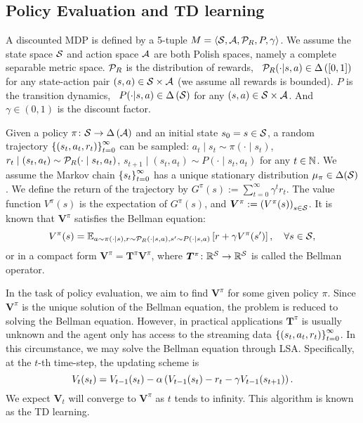 \subsection{Policy Evaluation and TD learning}\label{Subsection:policy_eval_and_TD}
A discounted MDP is defined by a 5-tuple $M=\langle{\mathcal{S}},{\mathcal{A}},{\mathcal{P}}_R,P,\gamma\rangle$.
We assume the state space ${\mathcal{S}}$ and action space ${\mathcal{A}}$ are both Polish spaces, namely a complete separable metric space.
${{\mathcal{P}}_R}$ is the distribution of rewards,  \ie\ ${\mathcal{P}}_R(\cdot|s,a)\in\Delta\left({[0,1]}\right)$ for any state-action pair $(s,a)\in{\mathcal{S}}\times{\mathcal{A}}$ (we assume all rewards is bounded).
${P}$ is the transition dynamics, \ie\ $P(\cdot|s,a)\in\Delta\left({{\mathcal{S}}}\right)$ for any $(s,a)\in{\mathcal{S}}\times{\mathcal{A}}$.
And $\gamma\in(0,1)$ is the discount factor.

Given a policy $\pi\colon{\mathcal{S}}\to\Delta\left({{\mathcal{A}}}\right)$ and an initial state $s_0=s\in{\mathcal{S}}$, a random trajectory $\left\{{\left({s_t,a_t,r_t}\right)}\right\}_{t=0}^\infty$ can be sampled: $a_t\mid s_t\sim\pi(\cdot\mid s_t)$, $r_t\mid (s_t,a_t)\sim {\mathcal{P}}_R({\cdot}\mid s_t,a_t)$, ${s_{t+1}}\mid{(s_t,a_t)}\sim P({\cdot}\mid{s_t,a_t})$ for any $t\in{\mathbb N}$.
We assume the Markov chain $\left\{{s_t}\right\}_{t=0}^\infty$ has a unique stationary distribution $\mu_\pi\in\Delta({\mathcal{S}})$.
We define the return of the trajectory by $G^\pi(s):=\sum_{t=0}^\infty \gamma^t r_t$.
The value function $V^\pi(s)$ is the expectation of $G^\pi(s)$, and ${\bm{V}}^\pi:=\left({V^\pi(s)}\right)_{s\in{\mathcal{S}}}$.
It is known that ${\bm{V}}^\pi$ satisfies the Bellman equation: 
\begin{equation}\label{eq:Bellman_equation}
            V^\pi(s)={\mathbb E}_{a\sim\pi(\cdot\mid s),r\sim {\mathcal{P}}_R({\cdot}\mid s,a),s^\prime\sim P(\cdot\mid s,a)}\left[{r+\gamma V^\pi(s^\prime)}\right],\quad\forall s\in{\mathcal{S}},
\end{equation}
or in a compact form ${\bm{V}}^\pi={\bm{T}}^\pi{\bm{V}}^\pi$, where ${\bm{T}}^\pi\colon {\mathbb R}^{\mathcal{S}}\to {\mathbb R}^{\mathcal{S}}$ is called the Bellman operator.

In the task of policy evaluation, we aim to find ${\bm{V}}^\pi$ for some given policy $\pi$.
Since ${\bm{V}}^\pi$ is the unique solution of the Bellman equation, the problem is reduced to solving the Bellman equation.
However, in practical applications ${\bm{T}}^\pi$ is usually unknown and the agent only has access to the streaming data $\left\{{\left({s_t,a_t,r_t}\right)}\right\}_{t=0}^\infty$.
In this circumstance, we may solve the Bellman equation through LSA.
Specifically, at the $t$-th time-step, the updating scheme is 
$$
{V}_{t}(s_t)=V_{t-1}(s_{t})-\alpha\left({V_{t-1}(s_{t})-r_t-\gamma V_{t-1}(s_{t+1})}\right).
$$
We expect ${\bm{V}_t}$ will converge to ${\bm{V}}^\pi$ as $t$ tends to infinity.
This algorithm is known as the TD learning.

